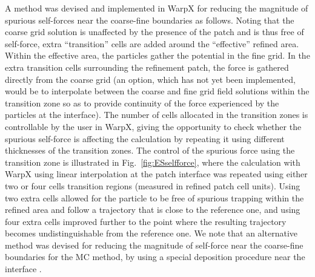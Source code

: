 A method was devised and implemented in WarpX for reducing the magnitude of spurious self-forces near the coarse-fine boundaries as follows. Noting that the coarse grid solution is unaffected by the presence of the patch and is thus free of self-force, extra ``transition'' cells  are added around the ``effective'' refined area.
Within the effective area, the particles gather the potential in the fine grid. In the extra transition cells surrounding the refinement patch, the force is gathered directly from the coarse grid (an option, which has not yet been implemented, would be to interpolate between the coarse and fine grid field solutions within the transition zone so as to provide continuity of the force experienced by the particles at the interface). The number of cells allocated in the transition zones is controllable by the user in WarpX, giving the opportunity to check whether the spurious self-force is affecting the calculation by repeating it using different thicknesses of the transition zones. The control of the spurious force using the transition zone is illustrated in Fig.~\ref{fig:ESselfforce}, where the calculation with WarpX using linear interpolation at the patch interface was repeated using either two or four cells transition regions (measured in refined patch cell units). Using two extra cells allowed for the particle to be free of spurious trapping within the refined area and follow a trajectory that is close to the reference one, and using four extra cells improved further to the point where the resulting trajectory becomes undistinguishable from the reference one. 
We note that an alternative method was devised for reducing the magnitude of self-force near the coarse-fine boundaries for the MC method, by using a special deposition procedure near the interface \cite{Colellajcp2010}. 


